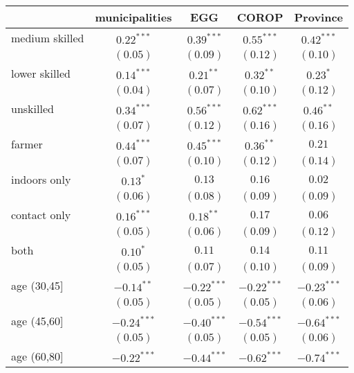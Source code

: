 
\begin{table}[h!]
\begin{center}
\begin{small}
\begin{tabular}{l c c c c}
\hline
 & municipalities & EGG & COROP & Province \\
\hline
medium skilled & $0.22^{***}$  & $0.39^{***}$  & $0.55^{***}$  & $0.42^{***}$  \\
               & $(0.05)$      & $(0.09)$      & $(0.12)$      & $(0.10)$      \\
lower skilled  & $0.14^{***}$  & $0.21^{**}$   & $0.32^{**}$   & $0.23^{*}$    \\
               & $(0.04)$      & $(0.07)$      & $(0.10)$      & $(0.12)$      \\
unskilled      & $0.34^{***}$  & $0.56^{***}$  & $0.62^{***}$  & $0.46^{**}$   \\
               & $(0.07)$      & $(0.12)$      & $(0.16)$      & $(0.16)$      \\
farmer         & $0.44^{***}$  & $0.45^{***}$  & $0.36^{**}$   & $0.21$        \\
               & $(0.07)$      & $(0.10)$      & $(0.12)$      & $(0.14)$      \\
indoors only   & $0.13^{*}$    & $0.13$        & $0.16$        & $0.02$        \\
               & $(0.06)$      & $(0.08)$      & $(0.09)$      & $(0.09)$      \\
contact only   & $0.16^{***}$  & $0.18^{**}$   & $0.17$        & $0.06$        \\
               & $(0.05)$      & $(0.06)$      & $(0.09)$      & $(0.12)$      \\
both           & $0.10^{*}$    & $0.11$        & $0.14$        & $0.11$        \\
               & $(0.05)$      & $(0.07)$      & $(0.10)$      & $(0.09)$      \\
age (30,45]    & $-0.14^{**}$  & $-0.22^{***}$ & $-0.22^{***}$ & $-0.23^{***}$ \\
               & $(0.05)$      & $(0.05)$      & $(0.05)$      & $(0.06)$      \\
age (45,60]    & $-0.24^{***}$ & $-0.40^{***}$ & $-0.54^{***}$ & $-0.64^{***}$ \\
               & $(0.05)$      & $(0.05)$      & $(0.05)$      & $(0.06)$      \\
age (60,80]    & $-0.22^{***}$ & $-0.44^{***}$ & $-0.62^{***}$ & $-0.74^{***}$ \\

\end{tabular}
\end{small}
\end{center}
\end{table}

